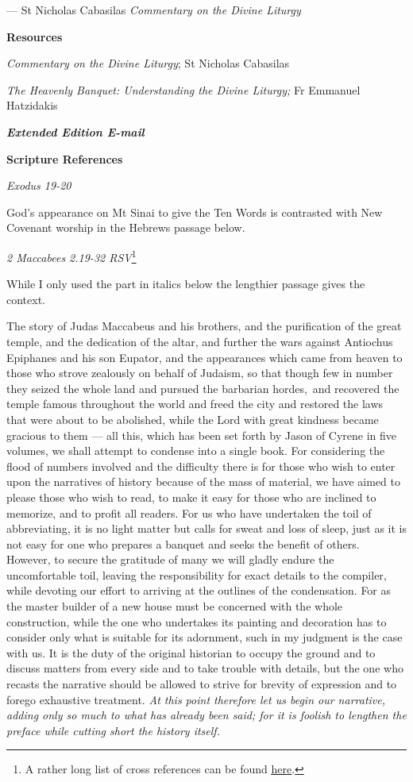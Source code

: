 \documentclass[
]{article}
\begin{document}
--- St Nicholas Cabasilas \emph{Commentary on the Divine Liturgy}

\textbf{Resources}

\emph{Commentary on the Divine Liturgy}; St Nicholas Cabasilas

\emph{The Heavenly Banquet: Understanding the Divine Liturgy;} Fr
Emmanuel Hatzidakis

\textbf{\emph{Extended Edition E-mail}}

\textbf{Scripture References}

\emph{Exodus 19-20}

God's appearance on Mt Sinai to give the Ten Words is contrasted with
New Covenant worship in the Hebrews passage below.

\emph{2 Maccabees 2.19-32 RSV}\footnote{A rather long list of cross
  references can be found
  \href{http://jimmyakin.com/deuterocanonical-references-in-the-new-testament}{\ul{here}}.}

While I only used the part in italics below the lengthier passage gives
the context.

The story of Judas Maccabeus and his brothers, and the purification of
the great temple, and the dedication of the altar, and further the wars
against Antiochus Epiphanes and his son Eupator, and the appearances
which came from heaven to those who strove zealously on behalf of
Judaism, so that though few in number they seized the whole land and
pursued the barbarian hordes,~and recovered the temple famous throughout
the world and freed the city and restored the laws that were about to be
abolished, while the Lord with great kindness became gracious to them
--- all this, which has been set forth by Jason of Cyrene in five
volumes, we shall attempt to condense into a single book. For
considering the flood of numbers involved and the difficulty there is
for those who wish to enter upon the narratives of history because of
the mass of material, we have aimed to please those who wish to read, to
make it easy for those who are inclined to memorize, and to profit all
readers. For us who have undertaken the toil of abbreviating, it is no
light matter but calls for sweat and loss of sleep, just as it is not
easy for one who prepares a banquet and seeks the benefit of others.
However, to secure the gratitude of many we will gladly endure the
uncomfortable toil, leaving the responsibility for exact details to the
compiler, while devoting our effort to arriving at the outlines of the
condensation. For as the master builder of a new house must be concerned
with the whole construction, while the one who undertakes its painting
and decoration has to consider only what is suitable for its adornment,
such in my judgment is the case with us. It is the duty of the original
historian to occupy the ground and to discuss matters from every side
and to take trouble with details, but the one who recasts the narrative
should be allowed to strive for brevity of expression and to forego
exhaustive treatment. \emph{At this point therefore let us begin our
narrative, adding only so much to what has already been said; for it is
foolish to lengthen the preface while cutting short the history itself.}
\end{document}
